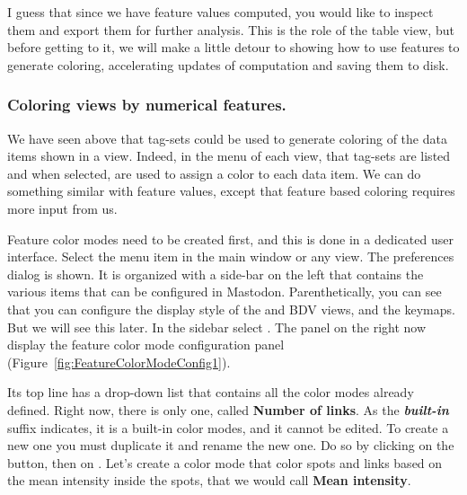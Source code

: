 I guess that since we have feature values computed, you would like to inspect them and export them for further analysis.
This is the role of the table view, but before getting to it, we will make a little detour to showing how to use features to generate coloring, accelerating updates of computation and saving them to disk.


\subsubsection{Coloring views by numerical features.}
\label{Configure_Color_Modes}

We have seen above that tag-sets could be used to generate coloring of the data items shown in a view. 
Indeed, in the  menu of each view, that tag-sets are listed and when selected, are used to assign a color to each data item.
We can do something similar with feature values, except that feature based coloring requires more input from us.

Feature color modes need to be created first, and this is done in a dedicated user interface. 
Select the  menu item in the main window or any view.
The preferences dialog is shown.
It is organized with a side-bar on the left that contains the various items that can be configured in Mastodon. 
Parenthetically, you can see that you can configure the display style of the \TrackScheme and BDV views, and the keymaps. 
But we will see this later.
In the sidebar select .
The panel on the right now display the feature color mode configuration panel (Figure~\ref{fig:FeatureColorModeConfig1}).

Its top line has a drop-down list that contains all the color modes already defined. 
Right now, there is only one, called \textbf{Number of links}.
As the \textbf{\textit{built-in}} suffix indicates, it is a built-in color modes, and it cannot be edited. 
To create a new one you must duplicate it and rename the new one.   
Do so by clicking on the  button, then on .
Let's create a color mode that color spots and links based on the mean intensity inside the spots, that we would call \textbf{Mean intensity}.

